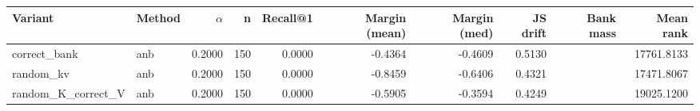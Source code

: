 \begin{tabular}{l l r r r r r r r r}
\toprule
Variant & Method & $\alpha$ & n & Recall@1 & Margin (mean) & Margin (med) & JS drift & Bank mass & Mean rank \\
\midrule
correct\_bank & anb & 0.2000 & 150 & 0.0000 & -0.4364 & -0.4609 & 0.5130 &  & 17761.8133 \\
random\_kv & anb & 0.2000 & 150 & 0.0000 & -0.8459 & -0.6406 & 0.4321 &  & 17471.8067 \\
random\_K\_correct\_V & anb & 0.2000 & 150 & 0.0000 & -0.5905 & -0.3594 & 0.4249 &  & 19025.1200 \\
\bottomrule
\end{tabular}
